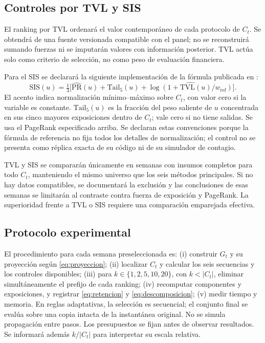 \documentclass[journal]{IEEEtran}
\begin{document}
\subsection{Controles por TVL y SIS}

El ranking por TVL ordenará el valor contemporáneo de cada protocolo de $C_t$.
Se obtendrá de una fuente versionada compatible con el panel; no se reconstruirá
sumando fuerzas ni se imputarán valores con información posterior. TVL actúa
solo como criterio de selección, no como peso de evaluación financiera.

Para el SIS se declarará la siguiente implementación de la fórmula publicada
en \cite{shu2026dexposurefm}:
\begin{equation}
\mathrm{SIS}(u)=\tfrac13\bigl[\widehat{\mathrm{PR}}(u)
+\mathrm{Tail}_5(u)+\widehat{\log(1+\mathrm{TVL}(u)/w_{\mathrm{ref}})}\bigr].
\label{eq:sis}
\end{equation}
El acento indica normalización mínimo--máximo sobre $C_t$, con valor cero
si la variable es constante. $\mathrm{Tail}_5(u)$ es la fracción del peso
saliente de $u$ concentrada en sus cinco mayores exposiciones dentro de $C_t$;
vale cero si no tiene salidas. Se usa el PageRank especificado arriba. Se
declaran estas convenciones porque la fórmula de referencia no fija todos los
detalles de normalización; el control no se presenta como réplica exacta de
su código ni de su simulador de contagio.

TVL y SIS se compararán únicamente en semanas con insumos completos para todo
$C_t$, manteniendo el mismo universo que los seis métodos principales. Si no
hay datos compatibles, se documentará la exclusión y las conclusiones de esas
semanas se limitarán al contraste contra fuerza de exposición y PageRank.
La superioridad frente a TVL o SIS requiere una comparación emparejada efectiva.

\subsection{Protocolo experimental}

El procedimiento para cada semana preseleccionada es: (i) construir $G_t$ y
su proyección según \eqref{eq:proyeccion}; (ii) localizar $C_t$ y calcular los
seis secuencias y los controles disponibles; (iii) para $k\in\{1,2,5,10,20\}$,
con $k<|C_t|$, eliminar simultáneamente
el prefijo de cada ranking; (iv) recomputar componentes y exposiciones, y
registrar \eqref{eq:retencion} y \eqref{eq:descomposicion}; (v) medir tiempo
y memoria. En reglas adaptativas, la selección es secuencial; el conjunto final
se evalúa sobre una copia intacta de la instantánea original. No se simula
propagación entre pasos. Los presupuestos se fijan antes de observar resultados.
Se informará además $k/|C_t|$ para interpretar su escala relativa.
\end{document}
